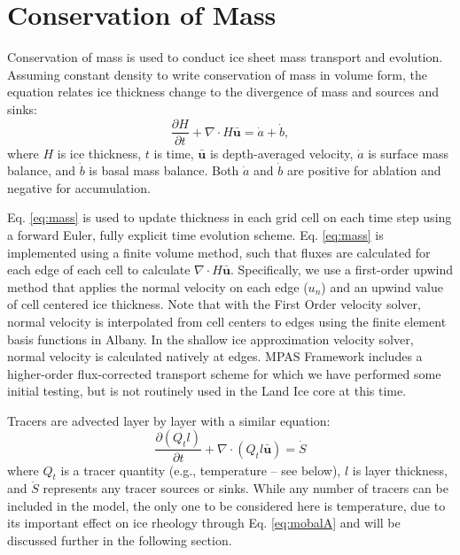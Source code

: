 \section{Conservation of Mass}
\label{sec:consMass}

Conservation of mass is used to conduct ice sheet mass transport and evolution.
Assuming constant density to write conservation of mass in volume form, 
the equation relates ice thickness change to the divergence of mass and sources and sinks:
\begin{equation}
\frac{\partial H}{\partial t} + \nabla \cdot H \mathbf{\bar{u}} = \dot{a} + \dot{b},
\label{eq:mass}
\end{equation}
where $H$ is ice thickness, $t$ is time, $\mathbf{\bar{u}}$ is depth-averaged velocity,
$\dot{a}$ is surface mass balance, and $\dot{b}$ is basal mass balance.
Both $\dot{a}$ and $\dot{b}$ are positive for ablation and negative for accumulation.

Eq. \ref{eq:mass} is used to update thickness in each grid cell on each time step using 
a forward Euler, fully explicit time evolution scheme.
Eq. \ref{eq:mass} is implemented using a finite volume method, such that fluxes are calculated for
each edge of each cell to calculate $\nabla \cdot H \mathbf{\bar{u}}$.
Specifically, we use a first-order upwind method that applies the normal velocity on each edge ($u_n$) and 
an upwind value of cell centered ice thickness.
Note that with the First Order velocity solver, normal velocity is interpolated from cell centers to
edges using the finite element basis functions in Albany.  
In the shallow ice approximation velocity solver, normal velocity is calculated natively at edges.
MPAS Framework includes a higher-order flux-corrected transport scheme \citep{Ringler2013} 
for which we have performed some initial testing, but is not routinely used in the Land Ice core at this time.

Tracers are advected layer by layer with a similar equation:
\begin{equation}
\frac{\partial (Q_t l)}{\partial t} + \nabla \cdot \left( Q_t l \mathbf{\bar{u}} \right)= \dot{S}
\label{eq:tracers}
\end{equation}
where $Q_t$ is a tracer quantity (e.g., temperature -- see below), $l$ is layer thickness, and $\dot{S}$ represents any tracer sources or sinks.
While any number of tracers can be included in the model, the only one to be considered here is temperature,
due to its important effect on ice rheology through Eq. \ref{eq:mobalA}
and will be discussed further in the following section. 

